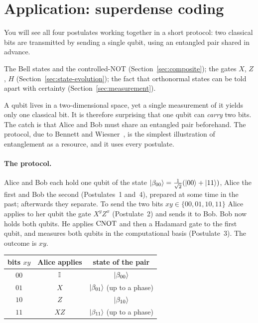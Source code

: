 \section{Application: superdense coding}\label{sec:superdense}

\begin{objectives}
  You will see all four postulates working together in a short protocol: two classical bits are transmitted
  by sending a single qubit, using an entangled pair shared in advance.
\end{objectives}

\begin{recall}
  The Bell states and the controlled-NOT (Section~\ref{sec:composite}); the gates $X$, $Z$, $H$ (Section~\ref{sec:state-evolution}); the fact that orthonormal states can be told apart with certainty (Section~\ref{sec:measurement}).
\end{recall}

A qubit lives in a two-dimensional space, yet a single measurement of it yields only one classical bit. It is therefore surprising that one qubit can
\emph{carry} two bits. The catch is that Alice and Bob must share an entangled pair beforehand. The protocol, due to Bennett and Wiesner~\cite{bennett1992}, is the simplest illustration of entanglement as a resource, and it uses every postulate.

\paragraph{The protocol.}
Alice and Bob each hold one qubit of the state $\left|\beta_{00}\right\rangle=\frac1{\sqrt2}(\left|00\right\rangle+\left|11\right\rangle)$, Alice the first and Bob the second (Postulates~1 and~4), prepared at some time in the past; afterwards they separate.
To send the two bits $xy\in\{00,01,10,11\}$ Alice applies to her qubit the gate $X^yZ^x$ (Postulate~2) and sends it to Bob. Bob now holds both qubits. He applies $\mathrm{CNOT}$ and then a Hadamard gate to the first qubit, and measures both qubits in the computational basis (Postulate~3). The outcome is $xy$.

\begin{center}
\small
\begin{tabular}{@{}ccc@{}}
  \toprule
  bits $xy$ & Alice applies & state of the pair\\
  \midrule
  $00$ & $\mathbb{I}$ & $\left|\beta_{00}\right\rangle$\\
  $01$ & $X$ & $\left|\beta_{01}\right\rangle$ (up to a phase)\\
  $10$ & $Z$ & $\left|\beta_{10}\right\rangle$\\
  $11$ & $XZ$ & $\left|\beta_{11}\right\rangle$ (up to a phase)\\
  \bottomrule
\end{tabular}
\end{center}

